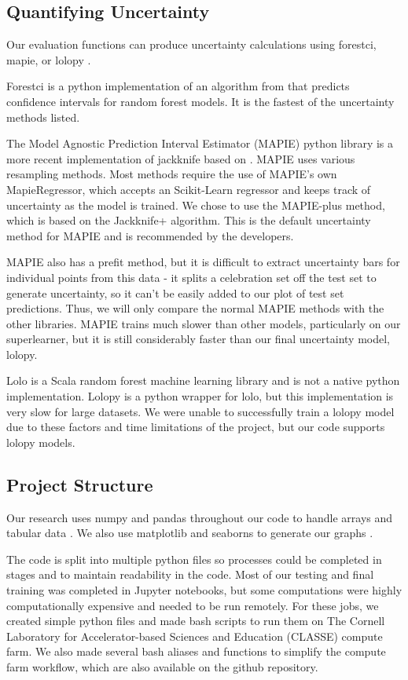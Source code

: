 \documentclass[twocolumn, nofootinbib, secnumarabic, amssymb, nobibnotes, aps, prd]{revtex4-2}
\begin{document}
\subsection{Quantifying Uncertainty}\label{sec:uncertainty}
Our evaluation functions can produce uncertainty calculations using forestci, mapie, or lolopy \cite{Polimis2017, Taquet2022, Hutchinson2022}. 

Forestci is a python implementation of an algorithm from \cite{Wager2014} that predicts confidence intervals for random forest models. It is the fastest of the uncertainty methods listed. 

The Model Agnostic Prediction Interval Estimator (MAPIE) python library is a more recent implementation of jackknife based on \cite{Foygel2020}. MAPIE uses various resampling methods. Most methods require the use of MAPIE's own MapieRegressor, which accepts an Scikit-Learn regressor and keeps track of uncertainty as the model is trained. We chose to use the MAPIE-plus method, which is based on the Jackknife+ algorithm. This is the default uncertainty method for MAPIE and is recommended by the developers.

MAPIE also has a prefit method, but it is difficult to extract uncertainty bars for individual points from this data - it splits a celebration set off the test set to generate uncertainty, so it can't be easily added to our plot of test set predictions. Thus, we will only compare the normal MAPIE methods with the other libraries. MAPIE trains much slower than other models, particularly on our superlearner, but it is still considerably faster than our final uncertainty model, lolopy.

Lolo is a Scala random forest machine learning library and is not a native python implementation. Lolopy is a python wrapper for lolo, but this implementation is very slow for large datasets. We were unable to successfully train a lolopy model due to these factors and time limitations of the project, but our code supports lolopy models.

\subsection{Project Structure} 

Our research uses numpy and pandas throughout our code to handle arrays and tabular data \cite{Harris2020array, Reback2020pandas}. We also use matplotlib and seaborns to generate our graphs \cite{Hunter2007, Waskom2021}.

The code is split into multiple python files so processes could be completed in stages and to maintain readability in the code. Most of our testing and final training was completed in Jupyter notebooks, but some computations were highly computationally expensive and needed to be run remotely. For these jobs, we created simple python files and made bash scripts to run them on The Cornell Laboratory for Accelerator-based Sciences and Education (CLASSE) compute farm. We also made several bash aliases and functions to simplify the compute farm workflow, which are also available on the github repository. 
\end{document}
